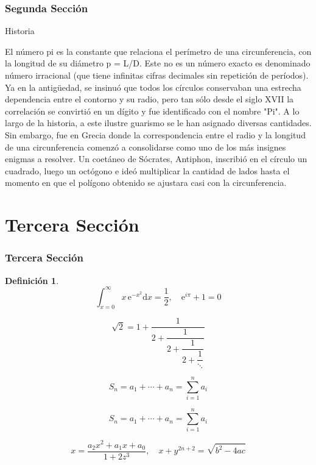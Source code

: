 \documentclass{beamer}
\newtheorem{definicion}{Definición}
\begin{document}
\begin{frame}

\frametitle{Segunda Sección}

\begin{block}{Historia}
 
El número pi es la constante que relaciona el perímetro de una circunferencia,
con la longitud de su diámetro p = L/D. Este no es un número exacto es denominado número irracional
(que tiene infinitas cifras decimales sin repetición de períodos). Ya en la antigüedad, se insinuó que todos los círculos
conservaban una estrecha dependencia entre el contorno y su radio, pero tan sólo desde el siglo XVII la correlación se
convirtió en un dígito y fue identificado con el nombre "Pi". A lo largo de la historia, a este ilustre guarismo se le han asignado diversas cantidades.
Sin embargo, fue en Grecia donde la correspondencia entre el radio y la longitud de una circunferencia comenzó a consolidarse
como uno de los más insignes enigmas a resolver. Un coetáneo de Sócrates, Antiphon, inscribió en el círculo un cuadrado,
luego un octógono e ideó multiplicar la cantidad de lados hasta el momento en que el polígono obtenido se ajustara casi con
la circunferencia.

\end{block}

\end{frame}



\section{Tercera Sección}


\begin{frame}

\frametitle{Tercera Sección}

\begin{definicion}
\[\int_{x=0}^{\infty} x\,\text{e}^{-x^2}\text{d}x=\frac{1}{2},\quad\text{e}^{i\pi}+1=0\]

\[ \sqrt 2 = 1+\dfrac{1}{2+\dfrac{1}{2+\dfrac{1}{2+\dfrac{1}{\ddots}}}} \]

\[ S_n=a_1+\cdots + a_n = \sum_{i=1}^n a_i \]

\[ S_n=a_1+\cdots + a_n = \sum_{i=1}^n a_i \]

\[x=\frac{a_2 x^2 + a_1 x + a_0}{1+2z^3}, \quad x+y^{2n+2}=\sqrt{b^2-4ac}\]

\end{definicion}

\end{frame}
\end{document}

